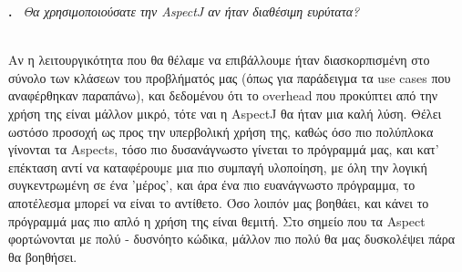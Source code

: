 \documentclass[12pt]{article}
\newcounter{problem}
\newcounter{solution}
\newcommand\Problem{%
  \stepcounter{problem}%
  \textbf{\theproblem.}~%
  \setcounter{solution}{0}%
}
\newcommand\TheSolution{%
  \textbf{}\\%
}
\begin{document}
\Problem \textit{Θα χρησιμοποιούσατε την \textlatin{AspectJ} αν ήταν διαθέσιμη ευρύτατα?}

\TheSolution
Αν η λειτουργικότητα που θα θέλαμε να επιβάλλουμε ήταν διασκορπισμένη στο σύνολο των κλάσεων του προβλήματός μας (όπως για παράδειγμα τα \textlatin{use cases} 
που αναφέρθηκαν παραπάνω), και δεδομένου ότι το \textlatin{overhead} που προκύπτει από την χρήση της είναι μάλλον μικρό, τότε ναι η \textlatin{AspectJ} θα ήταν μια καλή
λύση. Θέλει ωστόσο προσοχή ως προς την υπερβολική χρήση της, καθώς όσο πιο πολύπλοκα γίνονται τα \textlatin{Aspects}, τόσο πιο δυσανάγνωστο γίνεται το πρόγραμμά
μας, και κατ' επέκταση αντί να καταφέρουμε μια πιο συμπαγή υλοποίηση, με όλη την λογική συγκεντρωμένη σε ένα 'μέρος', και άρα ένα πιο ευανάγνωστο πρόγραμμα,
το αποτέλεσμα μπορεί να είναι το αντίθετο. Όσο λοιπόν μας βοηθάει, και κάνει το πρόγραμμά μας πιο απλό  η χρήση της είναι θεμιτή. Στο σημείο που τα \textlatin{Aspect} φορτώνονται με
πολύ - δυσνόητο κώδικα, μάλλον πιο πολύ θα μας δυσκολέψει πάρα θα βοηθήσει.
\end{document}
